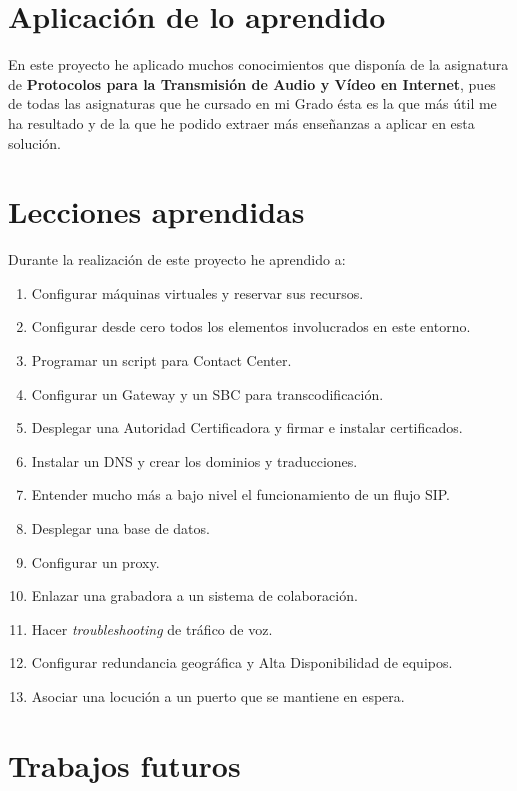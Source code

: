 \documentclass[a4paper, 12pt]{book}
\begin{document}
\section{Aplicación de lo aprendido}
\label{sec:aplicacion}

En este proyecto he aplicado muchos conocimientos que disponía de la asignatura de \textbf{Protocolos para la Transmisión de Audio y Vídeo en Internet}, pues de todas las asignaturas que he cursado en mi Grado ésta es la que más útil me ha resultado y de la que he podido extraer más enseñanzas a aplicar en esta solución.

\section{Lecciones aprendidas}
\label{sec:lecciones_aprendidas}

Durante la realización de este proyecto he aprendido a:

\begin{enumerate}
  \item Configurar máquinas virtuales y reservar sus recursos.
  \item Configurar desde cero todos los elementos involucrados en este entorno.
  \item Programar un script para Contact Center.
  \item Configurar un Gateway y un SBC para transcodificación.
  \item Desplegar una Autoridad Certificadora y firmar e instalar certificados.
  \item Instalar un DNS y crear los dominios y traducciones.
  \item Entender mucho más a bajo nivel el funcionamiento de un flujo SIP.
  \item Desplegar una base de datos.
  \item Configurar un proxy.
  \item Enlazar una grabadora a un sistema de colaboración.
  \item Hacer \emph{troubleshooting} de tráfico de voz.
  \item Configurar redundancia geográfica y Alta Disponibilidad de equipos.
  \item Asociar una locución a un puerto que se mantiene en espera.
\end{enumerate}


\section{Trabajos futuros}
\label{sec:trabajos_futuros}
\end{document}
